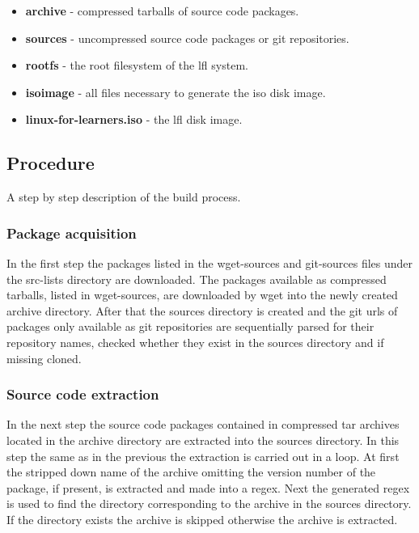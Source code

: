 \begin{itemize}
    \item \textbf{archive} - compressed tarballs of source code packages.
    \item \textbf{sources} - uncompressed source code packages or git repositories.
    \item \textbf{rootfs} - the root filesystem of the \gls{lfl} system.
    \item \textbf{isoimage} - all files necessary to generate the \gls{iso} disk image.
    \item \textbf{linux-for-learners.iso} - the \gls{lfl} disk image.
\end{itemize}

\newpage

\subsection{Procedure}

A step by step description of the build process.

\subsubsection{Package acquisition}

In the first step the packages listed in the wget-sources and git-sources files under the src-lists directory are downloaded. The packages available as compressed tarballs, listed in wget-sources, are downloaded by wget into the newly created archive directory. After that the sources directory is created and the git \glspl{url} of packages only available as git repositories are sequentially parsed for their repository names, checked whether they exist in the sources directory and if missing cloned.


\subsubsection{Source code extraction}

In the next step the source code packages contained in compressed tar archives located in the archive directory are extracted into the sources directory. In this step the same as in the previous the extraction is carried out in a loop. At first the stripped down name of the archive omitting the version number of the package, if present, is extracted and made into a \gls{regex}. Next the generated \gls{regex} is used to find the directory corresponding to the archive in the sources directory. If the directory exists the archive is skipped otherwise the archive is extracted.

